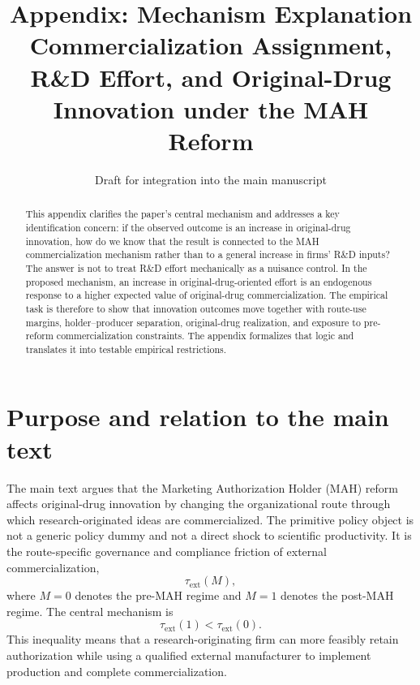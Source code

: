 \documentclass[12pt]{article}
\title{Appendix: Mechanism Explanation\\Commercialization Assignment, R\&D Effort, and Original-Drug Innovation under the MAH Reform}
\author{}
\date{Draft for integration into the main manuscript}
\newcommand{\tauext}{\tau_{\mathrm{ext}}}
\begin{document}
\maketitle

\begin{abstract}
\noindent
This appendix clarifies the paper's central mechanism and addresses a key identification concern: if the observed outcome is an increase in original-drug innovation, how do we know that the result is connected to the MAH commercialization mechanism rather than to a general increase in firms' R\&D inputs? The answer is not to treat R\&D effort mechanically as a nuisance control. In the proposed mechanism, an increase in original-drug-oriented effort is an endogenous response to a higher expected value of original-drug commercialization. The empirical task is therefore to show that innovation outcomes move together with route-use margins, holder--producer separation, original-drug realization, and exposure to pre-reform commercialization constraints. The appendix formalizes that logic and translates it into testable empirical restrictions.
\end{abstract}

\section{Purpose and relation to the main text}

The main text argues that the Marketing Authorization Holder (MAH) reform affects original-drug innovation by changing the organizational route through which research-originated ideas are commercialized. The primitive policy object is not a generic policy dummy and not a direct shock to scientific productivity. It is the route-specific governance and compliance friction of external commercialization,
\[
\tauext(M),
\]
where $M=0$ denotes the pre-MAH regime and $M=1$ denotes the post-MAH regime. The central mechanism is
\[
\tauext(1)<\tauext(0).
\]
This inequality means that a research-originating firm can more feasibly retain authorization while using a qualified external manufacturer to implement production and complete commercialization.
\end{document}
